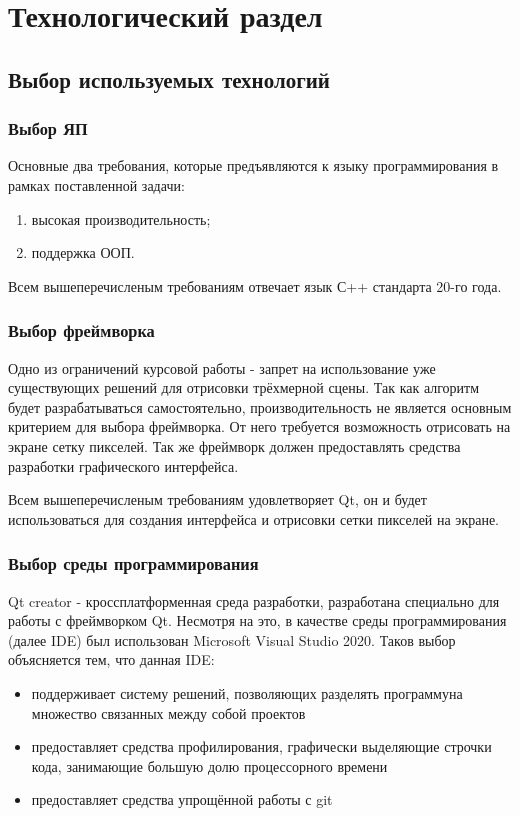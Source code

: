 \documentclass[a4paper, 14pt]{report}
\begin{document}
	\chapter{Технологический раздел}
	\section{Выбор используемых технологий}
	\subsection{Выбор ЯП}
	Основные два требования, которые предъявляются к языку программирования в рамках поставленной задачи:
	\begin{enumerate}
		\item высокая производительность;
		\item поддержка ООП.
	\end{enumerate}

	Всем вышеперечисленым требованиям отвечает язык С++ стандарта 20-го года.
	
	\subsection{Выбор фреймворка}
	Одно из ограничений курсовой работы - запрет на использование уже существующих решений для отрисовки трёхмерной сцены. Так как алгоритм будет разрабатываться самостоятельно, производительность не является основным критерием для выбора фреймворка. От него требуется возможность отрисовать на экране сетку пикселей. Так же фреймворк должен предоставлять средства разработки графического интерфейса.
	
	Всем вышеперечисленым требованиям удовлетворяет Qt, он и будет использоваться для создания интерфейса и отрисовки сетки пикселей на экране.
	
	\subsection{Выбор среды программирования}
	Qt creator - кроссплатформенная среда разработки, разработана специально для работы с фреймворком Qt. Несмотря на это, в качестве среды программирования (далее IDE) был использован Microsoft Visual Studio 2020. Таков выбор объясняется тем, что данная IDE:
	
	\begin{itemize}
		\item поддерживает систему решений, позволяющих разделять программуна множество связанных между собой проектов
		\item предоставляет средства профилирования, графически выделяющие строчки кода, занимающие большую долю процессорного времени
		\item предоставляет средства упрощённой работы с git
	\end{itemize}
	
\end{document}
